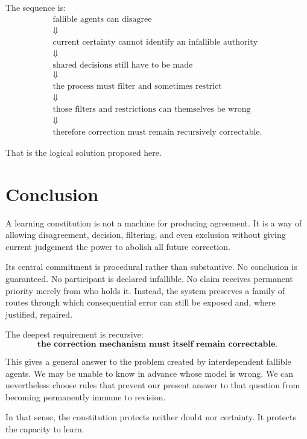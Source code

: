 \documentclass[11pt,a4paper]{article}
\begin{document}
The sequence is:
\[
\begin{gathered}
\text{fallible agents can disagree}\\
\Downarrow\\
\text{current certainty cannot identify an infallible authority}\\
\Downarrow\\
\text{shared decisions still have to be made}\\
\Downarrow\\
\text{the process must filter and sometimes restrict}\\
\Downarrow\\
\text{those filters and restrictions can themselves be wrong}\\
\Downarrow\\
\boxed{\text{therefore correction must remain recursively correctable}.}
\end{gathered}
\]

That is the logical solution proposed here.

\section{Conclusion}

A learning constitution is not a machine for producing agreement. It is a way of allowing disagreement, decision, filtering, and even exclusion without giving current judgement the power to abolish all future correction.

Its central commitment is procedural rather than substantive. No conclusion is guaranteed. No participant is declared infallible. No claim receives permanent priority merely from who holds it. Instead, the system preserves a family of routes through which consequential error can still be exposed and, where justified, repaired.

The deepest requirement is recursive:
\[
\boxed{\textbf{the correction mechanism must itself remain correctable}.}
\]

This gives a general answer to the problem created by interdependent fallible agents. We may be unable to know in advance whose model is wrong. We can nevertheless choose rules that prevent our present answer to that question from becoming permanently immune to revision.

In that sense, the constitution protects neither doubt nor certainty. It protects the capacity to learn.
\end{document}
